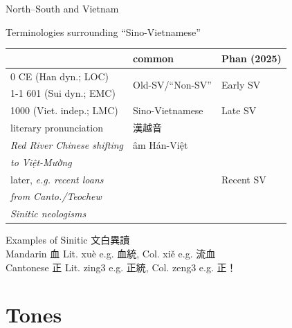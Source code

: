 \documentclass{beamer}
\begin{document}
\begin{frame}[fragile]{North–South and Vietnam}

Terminologies surrounding \enquote{Sino-Vietnamese}

\bigskip
{\footnotesize
\begin{tabular}{l l l}
 & common & Phan (2025)\\ \hline
0 CE (Han dyn.; LOC) & \multirow{2}{*}{Old-SV/\enquote{Non-SV}} & \multirow{2}{*}{Early SV}\\ \cline{1-1}
601 (Sui dyn.; EMC) & & \\ \hline
1000 (Viet. indep.; LMC) & Sino-Vietnamese & Late SV\\
literary pronunciation & 漢越音 & \\
\textit{Red River Chinese shifting} & âm Hán-Việt & \\
\textit{to Việt-Mường} & & \\ \hline
later, \textit{e.g. recent loans} & & Recent SV \\
\textit{from Canto./Teochew} & & \\
\textit{Sinitic neologisms} & & \\
\end{tabular}
}

\medskip
Examples of Sinitic 文白異讀\\ 
Mandarin 血 Lit. xuè e.g. 血統, Col. xiě e.g. 流血\\
Cantonese 正 Lit. zing3 e.g. 正統, Col. zeng3 e.g. 正！\\ 

\end{frame}

\section{Tones}
\end{document}
